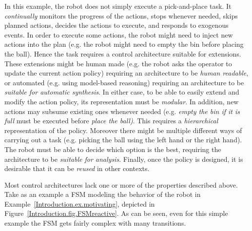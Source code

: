 In this example, the robot does not simply execute a pick-and-place task. It \emph{continually} monitors the progress of the actions, stops whenever needed, skips planned actions, decides the actions to execute, and responds to exogenous events. In order to execute some actions, the robot might need to inject new actions into the plan (e.g. the robot might need to empty the bin before placing the ball). Hence the task requires a  control architecture  suitable for extensions. These extensions might be human made (e.g. the robot asks the operator to update the current action policy) requiring an architecture to be \emph{human readable}, or automated (e.g. using model-based reasoning) requiring an architecture to be \emph{suitable for automatic synthesis}. In either case, to be able to easily extend and modify the action policy, its representation must be \emph{modular}. In addition, new actions may subsume existing ones whenever needed (e.g. \emph{empty the bin if it is full} must be executed before \emph{place the ball)}. This requires a \emph{hierarchical} representation of the policy. Moreover there might be multiple different ways of carrying out a task (e.g. picking the ball using the left hand or the right hand). The robot must be able to decide which option is the best, requiring the architecture to be \emph{suitable for analysis}. Finally, once the policy is designed, it is desirable that it can be \emph{reused} in other contexts.  %


Most  control architectures lack one or more of   the properties described above. Take as an example a FSM modeling the behavior of the robot in Example~\ref{Introduction.ex.motivating}, depicted in Figure~\ref{Introduction.fig.FSMreactive}. As can be seen, even for this simple example the FSM gets fairly complex with many transitions. 


